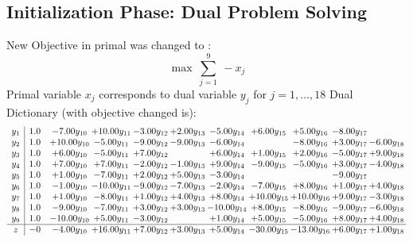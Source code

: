 \documentclass[9pt]{article}
\begin{document}
\subsection{Initialization Phase: Dual Problem Solving}
New Objective in primal was changed to : \[ \max\ \sum_{j=1}^{9}\ - x_j \] 
Primal variable $x_j$ corresponds to dual variable $y_j$ for $j = 1,\ldots,18$
Dual Dictionary (with objective changed is): 
\[\begin{array}{c| c c@{\hskip 2pt} c@{\hskip 2pt} c@{\hskip 2pt} c@{\hskip 2pt} c@{\hskip 2pt} c@{\hskip 2pt} c@{\hskip 2pt} c@{\hskip 2pt} c@{\hskip 2pt} }
 y_{1}   &  1.0 & -7.00 y_{10} & + 10.00 y_{11} & -3.00 y_{12} & +  2.00 y_{13} & -5.00 y_{14} & +  6.00 y_{15} & +  5.00 y_{16} & -8.00 y_{17} &   \\
 y_{2}   &  1.0 & + 10.00 y_{10} & -5.00 y_{11} & -9.00 y_{12} & -9.00 y_{13} & -6.00 y_{14} &   & -8.00 y_{16} & +  3.00 y_{17} & -6.00 y_{18}\\
 y_{3}   &  1.0 & +  6.00 y_{10} & -5.00 y_{11} & +  7.00 y_{12} &   & +  6.00 y_{14} & +  1.00 y_{15} & +  2.00 y_{16} & -5.00 y_{17} & +  9.00 y_{18}\\
 y_{4}   &  1.0 & +  7.00 y_{10} & +  7.00 y_{11} & -2.00 y_{12} & -1.00 y_{13} & +  9.00 y_{14} & -9.00 y_{15} & -5.00 y_{16} & +  3.00 y_{17} & -4.00 y_{18}\\
 y_{5}   &  1.0 & +  1.00 y_{10} & -7.00 y_{11} & +  2.00 y_{12} & +  5.00 y_{13} & -3.00 y_{14} &    &   & -9.00 y_{17} &   \\
 y_{6}   &  1.0 & -1.00 y_{10} & -10.00 y_{11} & -9.00 y_{12} & -7.00 y_{13} & -2.00 y_{14} & -7.00 y_{15} & +  8.00 y_{16} & +  1.00 y_{17} & +  4.00 y_{18}\\
 y_{7}   &  1.0 & +  1.00 y_{10} & -8.00 y_{11} & +  1.00 y_{12} & +  4.00 y_{13} & +  8.00 y_{14} & + 10.00 y_{15} & + 10.00 y_{16} & +  9.00 y_{17} & -3.00 y_{18}\\
 y_{8}   &  1.0 & -9.00 y_{10} & -7.00 y_{11} & +  3.00 y_{12} & +  3.00 y_{13} & -10.00 y_{14} & +  8.00 y_{15} & -8.00 y_{16} & -9.00 y_{17} & -6.00 y_{18}\\
 y_{9}   &  1.0 & -10.00 y_{10} & +  5.00 y_{11} & -3.00 y_{12} &   & +  1.00 y_{14} & +  5.00 y_{15} & -5.00 y_{16} & +  8.00 y_{17} & +  4.00 y_{18}\\
\hline
z    &  -0 & -4.00 y_{10} & + 16.00 y_{11} & +  7.00 y_{12} & +  3.00 y_{13} & +  5.00 y_{14} & -30.00 y_{15} & -13.00 y_{16} & +  6.00 y_{17} & +  1.00 y_{18}\\
\end{array}\]
\end{document}

